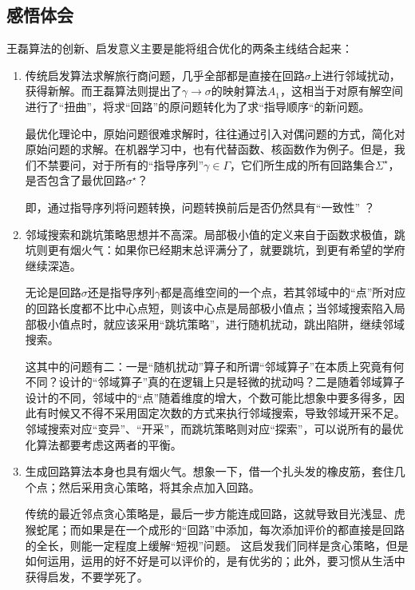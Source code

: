 \documentclass[12pt]{ctexart}
\begin{document}
\subsection{感悟体会}
王磊算法的创新、启发意义主要是能将组合优化的两条主线结合起来：

\begin{enumerate}
    \item 传统启发算法求解旅行商问题，几乎全部都是直接在回路$\sigma$上进行邻域扰动，获得新解。而王磊算法则提出了$\gamma \to \sigma$的映射算法$A_1$，这相当于对原有解空间进行了“扭曲”，将求“回路”的原问题转化为了求“指导顺序“的新问题。

          最优化理论中，原始问题很难求解时，往往通过引入对偶问题的方式，简化对原始问题的求解。在机器学习中，也有代替函数、核函数作为例子。但是，我们不禁要问，对于所有的“指导序列”$\gamma \in \Gamma$，它们所生成的所有回路集合$\Sigma^\star$，是否包含了最优回路$\sigma^\star$？

          即，通过指导序列将问题转换，问题转换前后是否仍然具有“一致性”  ？

    \item 邻域搜索和跳坑策略思想并不高深。局部极小值的定义来自于函数求极值，跳坑则更有烟火气：如果你已经期末总评满分了，就要跳坑，到更有希望的学府继续深造。

          无论是回路$\sigma$还是指导序列$\gamma$都是高维空间的一个点，若其邻域中的“点”所对应的回路长度都不比中心点短，则该中心点是局部极小值点；当邻域搜索陷入局部极小值点时，就应该采用“跳坑策略”，进行随机扰动，跳出陷阱，继续邻域搜索。

          这其中的问题有二：一是“随机扰动”算子和所谓“邻域算子”在本质上究竟有何不同？设计的“邻域算子”真的在逻辑上只是轻微的扰动吗？二是随着邻域算子设计的不同，邻域中的“点”随着维度的增大，个数可能比想象中要多得多，因此有时候又不得不采用固定次数的方式来执行邻域搜索，导致邻域开采不足。邻域搜索对应“变异”、“开采”，而跳坑策略则对应“探索”，可以说所有的最优化算法都要考虑这两者的平衡。

    \item 生成回路算法本身也具有烟火气。想象一下，借一个扎头发的橡皮筋，套住几个点；然后采用贪心策略，将其余点加入回路。

          传统的最近邻点贪心策略是，最后一步方能连成回路，这就导致目光浅显、虎猴蛇尾；而如果是在一个成形的“回路”中添加，每次添加评价的都直接是回路的全长，则能一定程度上缓解“短视”问题。
          这启发我们同样是贪心策略，但是如何运用，运用的好不好是可以评价的，是有优劣的；此外，要习惯从生活中获得启发，不要学死了。
\end{enumerate}
\end{document}
